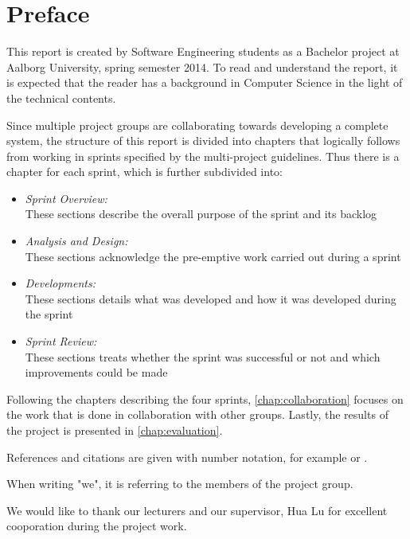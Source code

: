 \newcommand{\headerPreface}{Preface}
\cleardoublepage
{}
\pdfbookmark{\headerPreface}{chap:preface}
\chapter*{\headerPreface}\label{chap:preface}
This report is created by Software Engineering students as a Bachelor project at Aalborg University, spring semester 2014.
To read and understand the report, it is expected that the reader has a background in Computer Science in the light of the technical contents.


Since multiple project groups are collaborating towards developing a complete system, the structure of this report is divided into chapters that logically follows from working in sprints specified by the multi-project guidelines.
Thus there is a chapter for each sprint, which is further subdivided into:

\begin{itemize}
\item \textit{Sprint Overview:}\\
These sections describe the overall purpose of the sprint and its backlog
\item \textit{Analysis and Design:}\\
These sections acknowledge the pre-emptive work carried out during a sprint
\item \textit{Developments:}\\
These sections details what was developed and how it was developed during the sprint 
\item \textit{Sprint Review:}\\
These sections treats whether the sprint was successful or not and which improvements could be made
\end{itemize}

Following the chapters describing the four sprints, \cref{chap:collaboration} focuses on the work that is done in collaboration with other groups.
Lastly, the results of the project is presented in \cref{chap:evaluation}.

References and citations are given with number notation, for example \citet{launcher2011} or \cite{launcher2011}. 

When writing "we", it is referring to the members of the project group.

We would like to thank our lecturers and our supervisor, Hua Lu for excellent cooporation during the project work.
